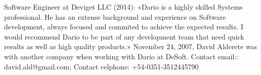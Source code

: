 \documentclass[paper=a4,fontsize=11pt]{scrartcl} %
\newcommand{\sepspace}{\vspace*{1em}}		%
\begin{document}
\sepspace

Software Engineer at Deviget LLC (2014):
«Dario is a highly skilled Systems professional. He has an extense background and experience on Software development, always focused and commited to achieve the expected results. I would recommend Dario to be part of any development team that need quick results as well as high quality products.»  
November 24, 2007, David Alderete was with another company when working with Dario at DeSoft.
Contact email:: david.ald@gmail.com; Contact celphone: +54-0351-3512445790

\sepspace
\end{document}
